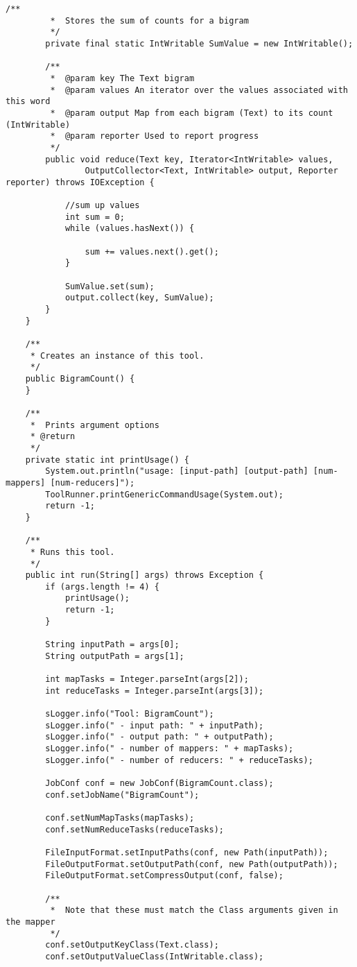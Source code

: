 \documentclass{article} %
\begin{document}
\begin{lstlisting}[style=Java]
		/**
		 *  Stores the sum of counts for a bigram
		 */
		private final static IntWritable SumValue = new IntWritable();

		/**
		 *  @param key The Text bigram 
		 *  @param values An iterator over the values associated with this word
		 *  @param output Map from each bigram (Text) to its count (IntWritable)
		 *  @param reporter Used to report progress
		 */
		public void reduce(Text key, Iterator<IntWritable> values,
				OutputCollector<Text, IntWritable> output, Reporter reporter) throws IOException {
			
			//sum up values
			int sum = 0;
			while (values.hasNext()) {
				
				sum += values.next().get();
			}
			
			SumValue.set(sum);
			output.collect(key, SumValue);
		}
	}

	/**
	 * Creates an instance of this tool.
	 */
	public BigramCount() {
	}

	/**
	 *  Prints argument options
	 * @return
	 */
	private static int printUsage() {
		System.out.println("usage: [input-path] [output-path] [num-mappers] [num-reducers]");
		ToolRunner.printGenericCommandUsage(System.out);
		return -1;
	}

	/**
	 * Runs this tool.
	 */
	public int run(String[] args) throws Exception {
		if (args.length != 4) {
			printUsage();
			return -1;
		}

		String inputPath = args[0];
		String outputPath = args[1];

		int mapTasks = Integer.parseInt(args[2]);
		int reduceTasks = Integer.parseInt(args[3]);

		sLogger.info("Tool: BigramCount");
		sLogger.info(" - input path: " + inputPath);
		sLogger.info(" - output path: " + outputPath);
		sLogger.info(" - number of mappers: " + mapTasks);
		sLogger.info(" - number of reducers: " + reduceTasks);

		JobConf conf = new JobConf(BigramCount.class);
		conf.setJobName("BigramCount");

		conf.setNumMapTasks(mapTasks);
		conf.setNumReduceTasks(reduceTasks);

		FileInputFormat.setInputPaths(conf, new Path(inputPath));
		FileOutputFormat.setOutputPath(conf, new Path(outputPath));
		FileOutputFormat.setCompressOutput(conf, false);

		/**
		 *  Note that these must match the Class arguments given in the mapper 
		 */
		conf.setOutputKeyClass(Text.class);
		conf.setOutputValueClass(IntWritable.class);


\end{lstlisting}
\end{document}

